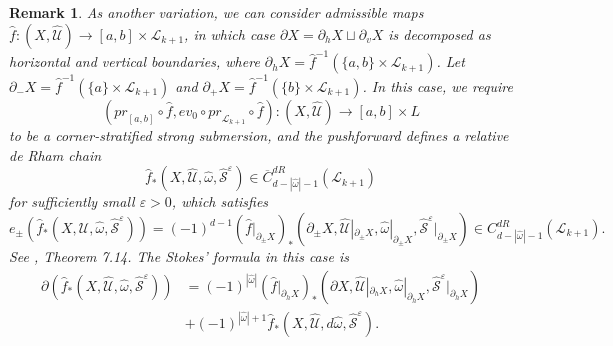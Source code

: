 \documentclass[a4paper]{article}
\newtheorem{remark}[theorem]{Remark}
\numberwithin{equation}{section}
\begin{document}
\begin{remark}
As another variation, we can consider admissible maps $\hat{f}:(X,\widehat{\mathcal{U}})\rightarrow[a,b]\times\mathcal{L}_{k+1}$, in which case $\partial X=\partial_hX\sqcup\partial_vX$ is decomposed as horizontal and vertical boundaries, where $\partial_hX=\hat{f}^{-1}\left(\{a,b\}\times\mathcal{L}_{k+1}\right)$. Let $\partial_-X=\hat{f}^{-1}(\{a\}\times\mathcal{L}_{k+1})$ and $\partial_+X=\hat{f}^{-1}(\{b\}\times\mathcal{L}_{k+1})$. In this case, we require
\begin{equation}
\left(\mathit{pr}_{[a,b]}\circ\hat{f},\mathit{ev}_0\circ\mathit{pr}_{\mathcal{L}_{k+1}}\circ\hat{f}\right):(X,\widehat{\mathcal{U}})\rightarrow[a,b]\times L
\end{equation}
to be a corner-stratified strong submersion, and the pushforward defines a relative de Rham chain
\begin{equation}
\hat{f}_\ast(X,\widehat{\mathcal{U}},\hat{\omega},\widehat{\mathcal{S}}^\varepsilon)\in \overline{C}_{d-|\hat{\omega}|-1}^\mathit{dR}(\mathcal{L}_{k+1})
\end{equation}
for sufficiently small $\varepsilon>0$, which satisfies
\begin{equation}\label{eq:epm}
e_\pm\left(\hat{f}_\ast(X,\widehat{\mathcal{U}},\hat{\omega},\widehat{\mathcal{S}}^\varepsilon)\right)=(-1)^{d-1}(\hat{f}|_{\partial_\pm X})_\ast\left(\partial_\pm X,\widehat{\mathcal{U}}|_{\partial_\pm X},\hat{\omega}|_{\partial_\pm X},\widehat{\mathcal{S}}^\varepsilon|_{\partial_\pm X}\right)\in C_{d-|\hat{\omega}|-1}^\mathit{dR}(\mathcal{L}_{k+1}).
\end{equation}
See \cite{ki2}, Theorem 7.14. The Stokes' formula in this case is
\begin{equation}
	\begin{split}
	\partial\left(\hat{f}_\ast(X,\widehat{\mathcal{U}},\hat{\omega},\widehat{\mathcal{S}}^\varepsilon)\right)&=(-1)^{|\hat{\omega}|}(\hat{f}|_{\partial_h X})_\ast\left(\partial X,\widehat{\mathcal{U}}|_{\partial_h X},\hat{\omega}|_{\partial_h X},\widehat{\mathcal{S}}^\varepsilon|_{\partial_h X}\right)\\
	&+(-1)^{|\hat{\omega}|+1}\hat{f}_\ast(X,\widehat{\mathcal{U}},d\hat{\omega},\widehat{\mathcal{S}}^\varepsilon).
	\end{split}
\end{equation}
\end{remark}
\end{document}
